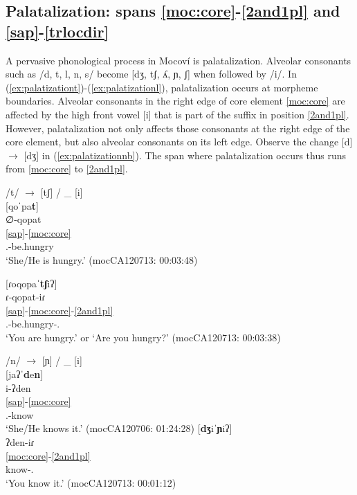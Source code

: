 \documentclass[output=paper]{langscibook}
\begin{document}
\subsection{Palatalization: spans \ref{moc:core}-\ref{2and1pl} and \ref{sap}-\ref{trlocdir}} \label{sec:palatalization}

A pervasive phonological process in Mocoví is palatalization. Alveolar consonants such as /d, t, l, n, s/ become [dʒ, tʃ, ʎ, ɲ, ʃ] when followed by /i/. 
In (\ref{ex:palatizationt})-(\ref{ex:palatizationl}), palatalization occurs at morpheme boundaries. Alveolar consonants in the right edge of core element \ref{moc:core} are affected by the high front vowel [i] that is part of the suffix in position \ref{2and1pl}. However, palatalization not only affects those consonants at the right edge of the core element, but also alveolar consonants on its left edge. Observe the change [d] $\rightarrow$ [dʒ] in (\ref{ex:palatizationnb}).
The span where palatalization occurs thus runs from \ref{moc:core} to \ref{2and1pl}.

\ea\label{ex:palatizationt}
    /t/ $\rightarrow$ [tʃ] / \_ [i] \\
    \ea{} [qoˈpa\textbf{t}] \\
    \glll ∅-qopat  \\
        \ref{sap}-\ref{moc:core}\\
      {\Third.\I}-be.hungry\\
    \glt `She/He is hungry.'  \hfill (mocCA120713: 00:03:48)

    \newpage
    \ex{} [ɾoqopaˈ\textbf{tʃ}iʔ] \\
    \glll       ɾ-qopat-iɾ  \\
    \ref{sap}-\ref{moc:core}-\ref{2and1pl}\\
    {\Second\Sg.\I}-be.hungry-{\Second\Sg.\I}\\
    \glt `You are hungry.' or `Are you hungry?'  \hfill (mocCA120713: 00:03:38)
    \z
\z 

\ea\label{ex:palatizationn}
/n/ $\rightarrow$ [ɲ] / \_ [i] \\
\ea\label{ex:palatizationna}
[jaʔˈ\textbf{d}e\textbf{n}]\\
\glll    i-ʔden  \\
    \ref{sap}-\ref{moc:core}\\
      {\Third.\II}-know\\
\glt `She/He knows it.'  \hfill (mocCA120706: 01:24:28)
\ex\label{ex:palatizationnb}
 [\textbf{dʒ}iˈ\textbf{ɲ}iʔ] \\
\glll        ʔden-iɾ \\
    \ref{moc:core}-\ref{2and1pl}\\
      know-{\Second\Sg.\II}\\
\glt `You know it.'  \hfill (mocCA120713: 00:01:12)
\z
\z
\end{document}
